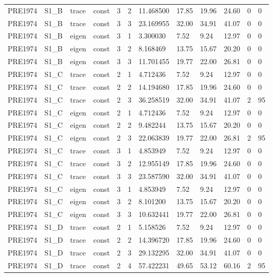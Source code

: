 \begin{tabular}{llllllllllll}
PRE1974 & S1\_B & trace & const & 3 & 2 & 11.468500 & 17.85 & 19.96 & 24.60 & 0 & 0 \\
PRE1974 & S1\_B & trace & const & 3 & 3 & 23.169955 & 32.00 & 34.91 & 41.07 & 0 & 0 \\
PRE1974 & S1\_B & eigen & const & 3 & 1 & 3.300030 & 7.52 & 9.24 & 12.97 & 0 & 0 \\
PRE1974 & S1\_B & eigen & const & 3 & 2 & 8.168469 & 13.75 & 15.67 & 20.20 & 0 & 0 \\
PRE1974 & S1\_B & eigen & const & 3 & 3 & 11.701455 & 19.77 & 22.00 & 26.81 & 0 & 0 \\
PRE1974 & S1\_C & trace & const & 2 & 1 & 4.712436 & 7.52 & 9.24 & 12.97 & 0 & 0 \\
PRE1974 & S1\_C & trace & const & 2 & 2 & 14.194680 & 17.85 & 19.96 & 24.60 & 0 & 0 \\
PRE1974 & S1\_C & trace & const & 2 & 3 & 36.258519 & 32.00 & 34.91 & 41.07 & 2 & 95 \\
PRE1974 & S1\_C & eigen & const & 2 & 1 & 4.712436 & 7.52 & 9.24 & 12.97 & 0 & 0 \\
PRE1974 & S1\_C & eigen & const & 2 & 2 & 9.482244 & 13.75 & 15.67 & 20.20 & 0 & 0 \\
PRE1974 & S1\_C & eigen & const & 2 & 3 & 22.063839 & 19.77 & 22.00 & 26.81 & 2 & 95 \\
PRE1974 & S1\_C & trace & const & 3 & 1 & 4.853949 & 7.52 & 9.24 & 12.97 & 0 & 0 \\
PRE1974 & S1\_C & trace & const & 3 & 2 & 12.955149 & 17.85 & 19.96 & 24.60 & 0 & 0 \\
PRE1974 & S1\_C & trace & const & 3 & 3 & 23.587590 & 32.00 & 34.91 & 41.07 & 0 & 0 \\
PRE1974 & S1\_C & eigen & const & 3 & 1 & 4.853949 & 7.52 & 9.24 & 12.97 & 0 & 0 \\
PRE1974 & S1\_C & eigen & const & 3 & 2 & 8.101200 & 13.75 & 15.67 & 20.20 & 0 & 0 \\
PRE1974 & S1\_C & eigen & const & 3 & 3 & 10.632441 & 19.77 & 22.00 & 26.81 & 0 & 0 \\
PRE1974 & S1\_D & trace & const & 2 & 1 & 5.158526 & 7.52 & 9.24 & 12.97 & 0 & 0 \\
PRE1974 & S1\_D & trace & const & 2 & 2 & 14.396720 & 17.85 & 19.96 & 24.60 & 0 & 0 \\
PRE1974 & S1\_D & trace & const & 2 & 3 & 29.132295 & 32.00 & 34.91 & 41.07 & 0 & 0 \\
PRE1974 & S1\_D & trace & const & 2 & 4 & 57.422231 & 49.65 & 53.12 & 60.16 & 2 & 95 \\

\end{tabular}
